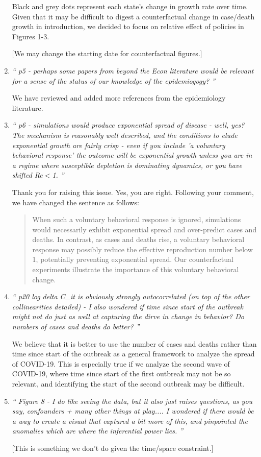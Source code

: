 \documentclass[11pt]{article}
\begin{document}
\begin{enumerate}
Black and grey dots represent each state's change in growth rate over time.  Given that it may be difficult to digest a counterfactual change in case/death growth in introduction, we decided to focus on relative effect of policies in Figures 1-3.
  
[We may change the starting date for counterfactual figures.]

\item \textit{`` p5 - perhaps some papers from beyond the Econ literature would be relevant for a sense of the status of our knowledge of the epidemiogogy?  ''}

We have reviewed and added more references from the epidemiology literature. 

\item \textit{`` p6 - simulations would produce exponential spread of disease - well, yes? The mechanism is reasonably well described, and the conditions to elude exponential growth are fairly crisp - even if you include 'a voluntary behavioral response' the outcome will be exponential growth unless you are in a regime where susceptible depletion is dominating dynamics, or you have shifted Re$<$1.  ''}
 
 Thank you for raising this issue. Yes, you are right. Following your comment, we have changed the sentence as follows:
\begin{quote}
When such a voluntary behavioral response is ignored, simulations would necessarily exhibit exponential spread and over-predict  cases and deaths. In contrast, as cases and deaths rise, a voluntary behavioral response may possibly reduce the effective reproduction number  below 1,  potentially preventing exponential spread. Our counterfactual experiments  illustrate the importance of this voluntary behavioral change. 
\end{quote}
 

\item \textit{`` p20 log delta C\_it is obviously strongly autocorrelated (on top of the other collinearities detailed) - I also wondered if time since start of the outbreak might not do just as well at capturing the dirve in change in behavior? Do numbers of cases and deaths do better? ''}

We believe that it is better to use the number of cases and deaths rather than time since start of the outbreak as a  general framework to analyze the spread of COVID-19. This is especially true if we analyze the second wave of COVID-19, where time since start of the first outbreak may not be so relevant, and identifying the start of the second outbreak may be difficult. 

\item \textit{`` Figure 8 - I do like seeing the data, but it also just raises questions, as you say, confounders + many other things at play.... I wondered if there would be a way to create a visual that captured a bit more of this, and pinpointed the anomalies which are where the inferential power lies. ''}

[This is something we don't do given the time/space constraint.]

\end{enumerate}
\end{document}
